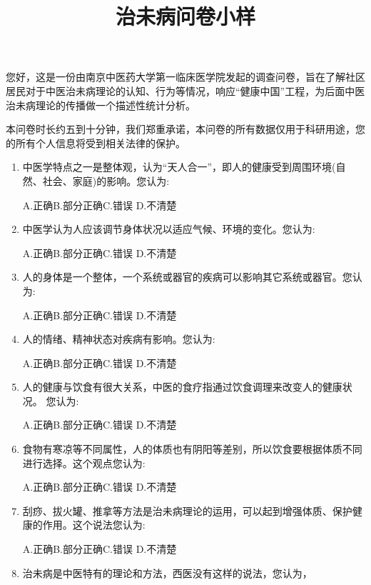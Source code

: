 \documentclass{article}
\title{治未病问卷小样}
\author{}
\date{}
\begin{document}
\maketitle
\clearpage

您好，这是一份由南京中医药大学第一临床医学院发起的调查问卷，旨在了解社区居民对于中医治未病理论的认知、行为等情况，响应“健康中国”工程，为后面中医治未病理论的传播做一个描述性统计分析。

本问卷时长约五到十分钟，我们郑重承诺，本问卷的所有数据仅用于科研用途，您的所有个人信息将受到相关法律的保护。

\begin{spacing}{0.9}
\begin{enumerate}
\item 中医学特点之一是整体观，认为“天人合一”，即人的健康受到周围环境(自然、社会、家庭)的影响。您认为:

A.正确\qquad B.部分正确\qquad C.错误 \qquad D.不清楚

\item 中医学认为人应该调节身体状况以适应气候、环境的变化。您认为:

A.正确\qquad B.部分正确\qquad C.错误 \qquad D.不清楚

\item 人的身体是一个整体，一个系统或器官的疾病可以影响其它系统或器官。您认为:

A.正确\qquad B.部分正确\qquad C.错误 \qquad D.不清楚

\item 人的情绪、精神状态对疾病有影响。您认为:

A.正确\qquad B.部分正确\qquad C.错误 \qquad D.不清楚

\item 人的健康与饮食有很大关系，中医的食疗指通过饮食调理来改变人的健康状况。
您认为:

A.正确\qquad B.部分正确\qquad C.错误 \qquad D.不清楚

\item 食物有寒凉等不同属性，人的体质也有阴阳等差别，所以饮食要根据体质不同进行选择。这个观点您认为:

A.正确\qquad B.部分正确\qquad C.错误 \qquad D.不清楚


\item 刮痧、拔火罐、推拿等方法是治未病理论的运用，可以起到增强体质、保护健康的作用。这个说法您认为:

A.正确\qquad B.部分正确\qquad C.错误 \qquad D.不清楚

\item 
治未病是中医特有的理论和方法，西医没有这样的说法，您认为，


\end{enumerate}
\end{spacing}
\end{document}
